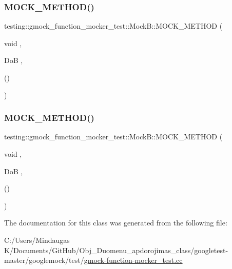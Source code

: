\subsubsection{\texorpdfstring{MOCK\_METHOD()}{MOCK\_METHOD()}\hspace{0.1cm}{\footnotesize\ttfamily [1/2]}}
{\footnotesize\ttfamily testing\+::gmock\+\_\+function\+\_\+mocker\+\_\+test\+::\+Mock\+B\+::\+M\+O\+C\+K\+\_\+\+M\+E\+T\+H\+OD (\begin{DoxyParamCaption}\item[{void}]{,  }\item[{DoB}]{,  }\item[{()}]{ }\end{DoxyParamCaption})}

\mbox{\label{classtesting_1_1gmock__function__mocker__test_1_1_mock_b_a4e897dd85777bec4fae42b78d4222f9b}} 
\subsubsection{\texorpdfstring{MOCK\_METHOD()}{MOCK\_METHOD()}\hspace{0.1cm}{\footnotesize\ttfamily [2/2]}}
{\footnotesize\ttfamily testing\+::gmock\+\_\+function\+\_\+mocker\+\_\+test\+::\+Mock\+B\+::\+M\+O\+C\+K\+\_\+\+M\+E\+T\+H\+OD (\begin{DoxyParamCaption}\item[{void}]{,  }\item[{DoB}]{,  }\item[{()}]{ }\end{DoxyParamCaption})}



The documentation for this class was generated from the following file\+:\begin{DoxyCompactItemize}
\item 
C\+:/\+Users/\+Mindaugas K/\+Documents/\+Git\+Hub/\+Obj\+\_\+\+Duomenu\+\_\+apdorojimas\+\_\+class/googletest-\/master/googlemock/test/\mbox{\hyperlink{googletest-master_2googlemock_2test_2gmock-function-mocker__test_8cc}{gmock-\/function-\/mocker\+\_\+test.\+cc}}\end{DoxyCompactItemize}
